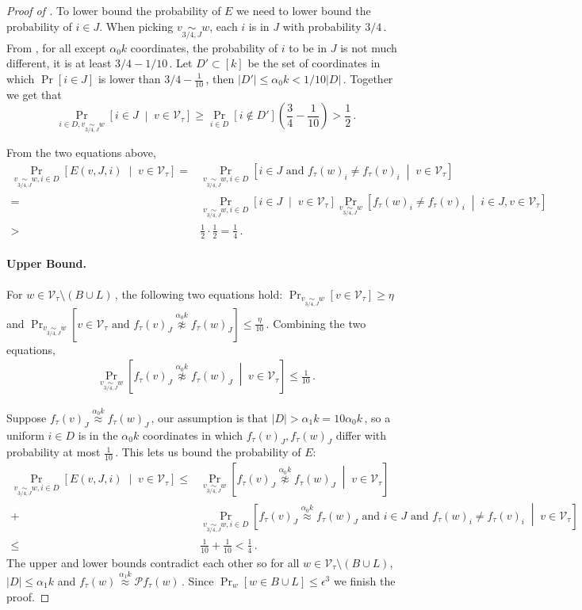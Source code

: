 \documentclass{toc}
\newcommand{\Prob}[2][]{\Pr_{{#1}}\left[#2\right]} %
\newcommand{\Paren}[1]{\left(#1\right)} %
\newcommand{\abs}[1]{\lvert#1\rvert} %
\newcommand{\given}{\;\middle\vert\;} %
\newcommand\f{f} %
\newcommand\bh{\mathcal{P}\f_\tau} %
\newcommand\neql[1]{\stackrel{{#1}}{ \approx}} %
\newcommand\neqg[1]{\stackrel{{#1}}{ \not\approx}} %
\newcommand\cons{\mathcal{V}} %
\newcommand\cor[1]{\underset{\scriptscriptstyle#1}{\sim}} %
\begin{document}
\begin{proof}[Proof of ]
	To lower bound the probability of $E$ we need to lower bound the probability of $i\in J$. When picking $v\cor{3/4,J}w$, each $i$ is in $J$ with probability 
	$3/4$\,. %
   {}From , for all except $\alpha_0 k$ coordinates, the probability of $i$ to be in $J$ is not much different, it is at least 
	$3/4-1/10$\,. Let $D'\subset [k]$ be the set of coordinates in which $\Pr[i\in J]$ is lower than $3/4-\frac{1}{10}$\,, then $\abs{D'}\leq\alpha_0 k <1/10\abs{D}$\,. %
	Together we get that
	\[ \Prob[i\in D,v\cor{3/4,J}w]{i\in J\given v\in \cons_\tau}\geq \Pr_{i\in D}[i\notin D']\Paren{\frac{3}{4}-\frac{1}{10}} > \frac{1}{2}\,. \] %
	

    From the two equations above,
	\begin{align*}
	\Prob[v\cor{3/4,J}w,i\in D]{E(v,J,i)\given v\in \cons_\tau} =& \Prob[v\cor{3/4,J}w,i\in D]{i\in J\textrm{ and }\f_\tau(w)_i \neq \f_\tau(v)_i \given v\in \cons_\tau} \\
	=&\Prob[v\cor{3/4,J}w,i\in D]{i\in J\given v\in \cons_\tau}\Prob[v\cor{3/4,J}w]{\f_\tau(w)_i \neq \f_\tau(v)_i\given i\in J,v\in \cons_\tau} \\
	>&  \frac{1}{2}\cdot\frac{1}{2}=\frac{1}{4}\,. %
	\end{align*}

	
	\paragraph*{Upper Bound.} 
	For $w \in \cons_\tau\setminus(B\cup L)$\,, the following two equations hold: $\Prob[v\cor{3/4,J}w]{v\in \cons_\tau}\geq\eta$ and
	$\Prob[v\cor{3/4,J}w]{v\in \cons_\tau \textrm{ and }\f_\tau(v)_J\neqg{\alpha_0 k}\f_\tau(w)_J}\leq\frac{\eta}{10}$\,. Combining the two equations,
	\begin{align}\label{eq:good w}
	\Prob[v\cor{3/4,J}w]{\f_\tau(v)_J\neqg{\alpha_0 k}\f_\tau(w)_J\given v\in \cons_\tau}\leq\frac{1}{10}\,.%
	\end{align}
	
	Suppose $\f_\tau(v)_J\neql{\alpha_0 k}\f_\tau(w)_J$\,, our assumption is that $\abs{D}>\alpha_1 k= 10\alpha_0 k$\,, so a uniform $i\in D$ is in the $\alpha_0 k$ coordinates in which $\f_\tau(v)_J,\f_\tau(w)_J$ differ with probability at most $\frac{1}{10}$\,. This lets us bound the probability of $E$:
	\begin{align*}
	\Prob[v\cor{3/4,J}w,i\in D]{E(v,J,i)\given v\in \cons_\tau} \leq& \Prob[v\cor{3/4,J}w]{\f_\tau(v)_J\neqg{\alpha_0 k}\f_\tau(w)_J\given v\in \cons_\tau} \\
	+& \Prob[v\cor{3/4,J}w,i\in D]{  \f_\tau(v)_J\neql{\alpha_0 k}\f_\tau(w)_J\textrm{ and }i\in J \textrm{ and }\f_\tau(w)_i \neq \f_\tau(v)_i\given v \in \cons_\tau}\\
	\leq&  \frac{1}{10} + \frac{1}{10} < \frac{1}{4}\,. %
	\end{align*}
	The upper and lower bounds contradict each other so for all $w\in \cons_\tau\setminus (B\cup L)$, $\abs{D}\leq \alpha_1 k$ and $\f_\tau(w) \neql{\alpha_1 k} \bh(w)$\,. Since $\Pr_w[w\in B\cup L]\leq\epsilon^3$ we finish the proof.
\end{proof}
\end{document}
